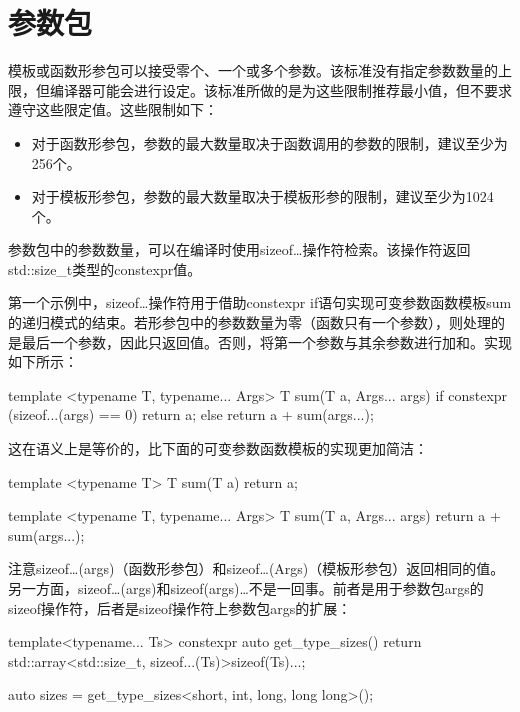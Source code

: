 \section{参数包}

模板或函数形参包可以接受零个、一个或多个参数。该标准没有指定参数数量的上限，但编译器可能会进行设定。该标准所做的是为这些限制推荐最小值，但不要求遵守这些限定值。这些限制如下：

\begin{itemize}
\item
对于函数形参包，参数的最大数量取决于函数调用的参数的限制，建议至少为256个。

\item
对于模板形参包，参数的最大数量取决于模板形参的限制，建议至少为1024个。
\end{itemize}

参数包中的参数数量，可以在编译时使用sizeof…操作符检索。该操作符返回std::size\_t类型的constexpr值。

第一个示例中，sizeof…操作符用于借助constexpr if语句实现可变参数函数模板sum的递归模式的结束。若形参包中的参数数量为零（函数只有一个参数），则处理的是最后一个参数，因此只返回值。否则，将第一个参数与其余参数进行加和。实现如下所示：

\begin{cpp}
template <typename T, typename... Args>
T sum(T a, Args... args)
{
	if constexpr (sizeof...(args) == 0)
		return a;
	else
		return a + sum(args...);
}
\end{cpp}

这在语义上是等价的，比下面的可变参数函数模板的实现更加简洁：

\begin{cpp}
template <typename T>
T sum(T a)
{
	return a;
}

template <typename T, typename... Args>
T sum(T a, Args... args)
{
	return a + sum(args...);
}
\end{cpp}

注意sizeof…(args)（函数形参包）和sizeof…(Args)（模板形参包）返回相同的值。另一方面，sizeof…(args)和sizeof(args)…不是一回事。前者是用于参数包args的sizeof操作符，后者是sizeof操作符上参数包args的扩展：

\begin{cpp}
template<typename... Ts>
constexpr auto get_type_sizes()
{
	return std::array<std::size_t,
	sizeof...(Ts)>{sizeof(Ts)...};
}

auto sizes = get_type_sizes<short, int, long, long long>();
\end{cpp}

